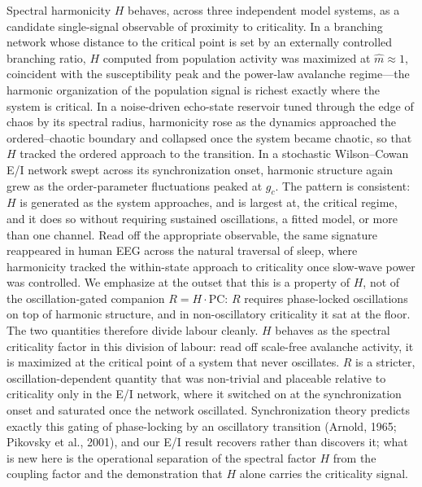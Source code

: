 \documentclass[11pt]{article}
\begin{document}
Spectral harmonicity $H$ behaves, across three independent model systems, as a candidate single-signal observable of proximity to criticality. In a branching network whose distance to the critical point is set by an externally controlled branching ratio, $H$ computed from population activity was maximized at $\hat m \approx 1$, coincident with the susceptibility peak and the power-law avalanche regime---the harmonic organization of the population signal is richest exactly where the system is critical. In a noise-driven echo-state reservoir tuned through the edge of chaos by its spectral radius, harmonicity rose as the dynamics approached the ordered--chaotic boundary and collapsed once the system became chaotic, so that $H$ tracked the ordered approach to the transition. In a stochastic Wilson--Cowan E/I network swept across its synchronization onset, harmonic structure again grew as the order-parameter fluctuations peaked at $g_c$. The pattern is consistent: $H$ is generated as the system approaches, and is largest at, the critical regime, and it does so without requiring sustained oscillations, a fitted model, or more than one channel. Read off the appropriate observable, the same signature reappeared in human EEG across the natural traversal of sleep, where harmonicity tracked the within-state approach to criticality once slow-wave power was controlled. We emphasize at the outset that this is a property of $H$, not of the oscillation-gated companion $R = H \cdot \mathrm{PC}$: $R$ requires phase-locked oscillations on top of harmonic structure, and in non-oscillatory criticality it sat at the floor. The two quantities therefore divide labour cleanly. $H$ behaves as the spectral criticality factor in this division of labour: read off scale-free avalanche activity, it is maximized at the critical point of a system that never oscillates. $R$ is a stricter, oscillation-dependent quantity that was non-trivial and placeable relative to criticality only in the E/I network, where it switched on at the synchronization onset and saturated once the network oscillated. Synchronization theory predicts exactly this gating of phase-locking by an oscillatory transition (Arnold, 1965; Pikovsky et al., 2001), and our E/I result recovers rather than discovers it; what is new here is the operational separation of the spectral factor $H$ from the coupling factor and the demonstration that $H$ alone carries the criticality signal.
\end{document}

